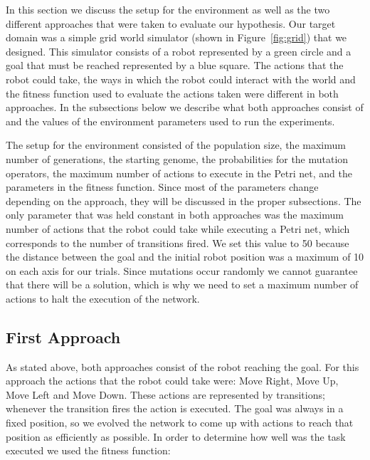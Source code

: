 \documentclass[12pt,a4paper,twocolumn]{article}
\begin{document}
In this section we discuss the setup for the environment as well as the two different approaches that were taken to evaluate our hypothesis. 
Our target domain was a simple grid world simulator (shown in Figure~\ref{fig:grid}) that we designed.
This simulator consists of a robot represented by a green circle and a goal that must be reached represented by a blue square. The actions that the robot could take, the ways in which the robot could interact with the world and the fitness function used to evaluate the actions taken were different in both approaches. In the subsections below we describe what both approaches consist of and the values of the environment parameters used to run the experiments.

The setup for the environment consisted of the population size, the maximum number of generations, the starting genome, the probabilities for the mutation operators, the maximum number of actions to execute in the Petri net, and the parameters in the fitness function. Since most of the parameters change depending on the approach, they will be discussed in the proper subsections. The only parameter that was held constant in both approaches was the maximum number of actions that the robot could take while executing a Petri net, which corresponds to the number of transitions fired. We set this value to 50 because the distance between the goal and the initial robot position was a maximum of 10 on each axis for our trials. Since mutations occur randomly we cannot guarantee that there will be a solution, which is why we need to set a maximum number of actions to halt the execution of the network.


\subsection{First Approach}
\label{subsec:firstApproach}
As stated above, both approaches consist of the robot reaching the goal. For this approach the actions that the robot could take were: Move Right, Move Up, Move Left and Move Down. These actions are represented by transitions; whenever the transition fires the action is executed. The goal was always in a fixed position, so we evolved the network to come up with actions to reach that position as efficiently as possible. In order to determine how well was the task executed we used the fitness function:
\end{document}

